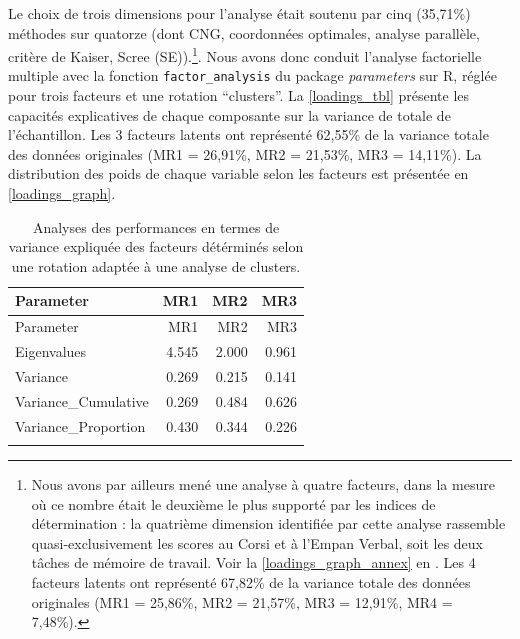 \documentclass[
  12pt,
]{article}
\begin{document}
Le choix de trois dimensions pour l'analyse était soutenu par cinq
(35,71\%) méthodes sur quatorze (dont CNG, coordonnées optimales,
analyse parallèle, critère de Kaiser, Scree (SE)).\footnote{Nous avons
  par ailleurs mené une analyse à quatre facteurs, dans la mesure où ce
  nombre était le deuxième le plus supporté par les indices de
  détermination : la quatrième dimension identifiée par cette analyse
  rassemble quasi-exclusivement les scores au Corsi et à l'Empan Verbal,
  soit les deux tâches de mémoire de travail. Voir la
  \autoref{loadings_graph_annex} en . Les 4 facteurs
  latents ont représenté 67,82\% de la variance totale des données
  originales (MR1 = 25,86\%, MR2 = 21,57\%, MR3 = 12,91\%, MR4 =
  7,48\%).}. Nous avons donc conduit l'analyse factorielle multiple avec
la fonction \texttt{factor\_analysis} du package \emph{parameters} sur
R, réglée pour trois facteurs et une rotation ``clusters''. La
\autoref{loadings_tbl} présente les capacités explicatives de chaque
composante sur la variance de totale de l'échantillon. Les 3 facteurs
latents ont représenté 62,55\% de la variance totale des données
originales (MR1 = 26,91\%, MR2 = 21,53\%, MR3 = 14,11\%). La
distribution des poids de chaque variable selon les facteurs est
présentée en \autoref{loadings_graph}.

\begin{longtable}[]{@{}lrrr@{}}
\toprule()
Parameter & MR1 & MR2 & MR3 \\
\midrule()
\endfirsthead
\toprule()
Parameter & MR1 & MR2 & MR3 \\
\midrule()
\endhead
Eigenvalues & 4.545 & 2.000 & 0.961 \\
Variance & 0.269 & 0.215 & 0.141 \\
Variance\_Cumulative & 0.269 & 0.484 & 0.626 \\
Variance\_Proportion & 0.430 & 0.344 & 0.226 \\
\bottomrule()
\caption{Analyses des performances en termes de variance expliquée des
facteurs détérminés selon une rotation adaptée à une analyse de
clusters.\label{loadings_tbl}}\tabularnewline
\end{longtable}
\end{document}
